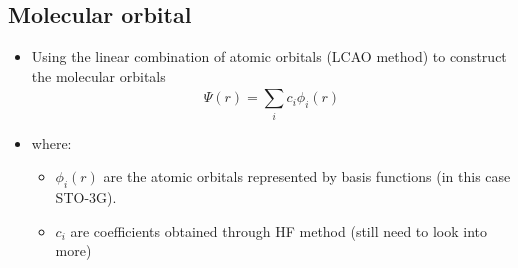 \documentclass{article}
\begin{document}
\subsection*{Molecular orbital}
    \begin{itemize}
        \item {Using the linear combination of atomic orbitals (LCAO method) to construct
        the molecular orbitals}
        \begin{equation}
            \Psi(r) = \sum_{i}^{} c_{i}\phi_i(r)
        \end{equation}
        \item where:
        \begin{itemize}
            \item \(\phi_i(r)\) are the atomic orbitals represented by basis functions (in this case STO-3G).
            \item \(c_i\) are coefficients obtained through HF method (still need to look into more)
        \end{itemize}
    \end{itemize}
    
\end{document}
